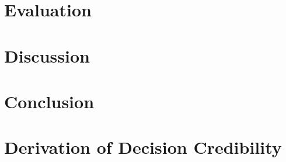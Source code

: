\documentclass[chi_draft]{sigchi}
\begin{document}

\section{Evaluation}
\label{sec:evaluation}

\section{Discussion}
\label{sec:discussion}


\section{Conclusion}





\appendix
\section{Derivation of Decision Credibility}
\label{sec:derivation}
\end{document}
